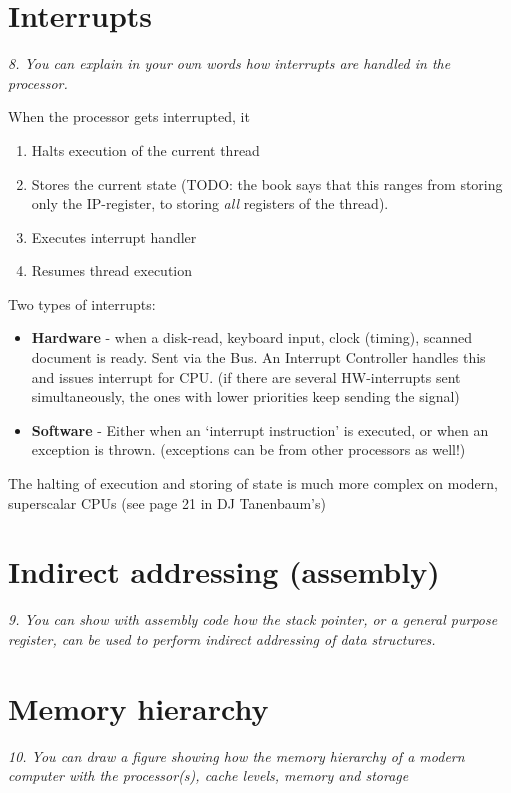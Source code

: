\documentclass{article}
\begin{document}
\section{Interrupts}
\emph{8. You can explain in your own words how interrupts are handled in the processor.}

When the processor gets interrupted, it
\begin{enumerate}
	\item Halts execution of the current thread
	\item Stores the current state (TODO: the book says that this ranges from storing only the IP-register, to storing \emph{all} registers of the thread).
	\item Executes interrupt handler
	\item Resumes thread execution
\end{enumerate}

Two types of interrupts:
\begin{itemize}
	\item \textbf{Hardware} - when a disk-read, keyboard input, clock (timing), scanned document is ready. Sent via the Bus.
	An Interrupt Controller handles this and issues interrupt for CPU.
	(if there are several HW-interrupts sent simultaneously, the ones with lower priorities keep sending the signal)

	\item \textbf{Software} - Either when an `interrupt instruction' is executed, or when an exception is thrown. (exceptions can be from other processors as well!)

\end{itemize}

The halting of execution and storing of state is much more complex on modern, superscalar CPUs (see page 21 in DJ Tanenbaum's)


\section{Indirect addressing (assembly)}
\emph{9. You can show with assembly code how the stack pointer, or a general purpose register, can be used to perform indirect addressing of data structures.}



\section{Memory hierarchy}
\emph{10. You can draw a figure showing how the memory hierarchy of a modern computer with the processor(s), cache levels, memory and storage}
\end{document}
